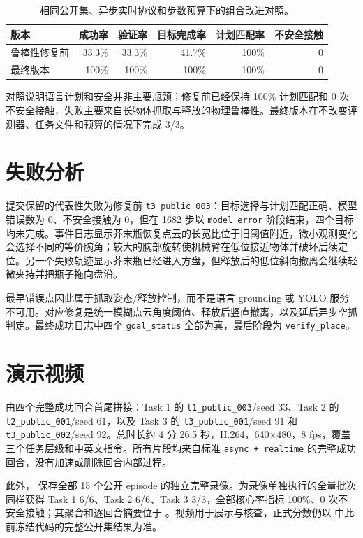 \documentclass[11pt,a4paper]{ctexart}
\begin{document}
\begin{table}[htbp]
\centering
\begin{tabular}{lrrrrr}
\toprule
版本 & 成功率 & 验证率 & 目标完成率 & 计划匹配率 & 不安全接触 \\
\midrule
鲁棒性修复前 & 33.3\% & 33.3\% & 41.7\% & 100\% & 0 \\
最终版本 & 100\% & 100\% & 100\% & 100\% & 0 \\
\bottomrule
\end{tabular}
\caption{相同公开集、异步实时协议和步数预算下的组合改进对照。}
\end{table}

对照说明语言计划和安全并非主要瓶颈；修复前已经保持 100\% 计划匹配和 0 次不安全接触，失败主要来自长物体抓取与释放的物理鲁棒性。最终版本在不改变评测器、任务文件和预算的情况下完成 3/3。

\section{失败分析}

提交保留的代表性失败为修复前 \texttt{t3\_public\_003}：目标选择与计划匹配正确、模型错误数为 0、不安全接触为 0，但在 1682 步以 \texttt{model\_error} 阶段结束，四个目标均未完成。事件日志显示芥末瓶恢复点云的长宽比位于旧阈值附近，微小观测变化会选择不同的等价腕角；较大的腕部旋转使机械臂在低位接近物体并破坏后续定位。另一个失败轨迹显示芥末瓶已经进入方盘，但释放后的低位斜向撤离会继续轻微夹持并把瓶子拖向盘沿。

最早错误点因此属于抓取姿态/释放控制，而不是语言 grounding 或 YOLO 服务不可用。对应修复是统一模糊点云角度阈值、释放后竖直撤离，以及延后异步空抓判定。最终成功日志中四个 \texttt{goal\_status} 全部为真，最后阶段为 \texttt{verify\_place}。

\section{演示视频}

 由四个完整成功回合首尾拼接：Task 1 的 \texttt{t1\_public\_003}/seed 33、Task 2 的 \texttt{t2\_public\_001}/seed 61，以及 Task 3 的 \texttt{t3\_public\_001}/seed 91 和 \texttt{t3\_public\_002}/seed 92。总时长约 4 分 26.5 秒，H.264，640$\times$480，8 fps，覆盖三个任务层级和中英文指令。所有片段均来自标准 \texttt{async + realtime} 的完整成功回合，没有加速或删除回合内部过程。

此外， 保存全部 15 个公开 episode 的独立完整录像。为录像单独执行的全量批次同样获得 Task 1 6/6、Task 2 6/6、Task 3 3/3，全部核心率指标 100\%、0 次不安全接触；其聚合和逐回合摘要位于 。视频用于展示与核查，正式分数仍以  中此前冻结代码的完整公开集结果为准。
\end{document}
